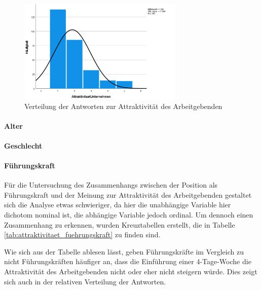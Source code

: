 \begin{figure}[h]
    \centering
    \includegraphics[width=0.7\textwidth]{04_Artefakte/01_Abbildungen/hypothese_5/attraktivitaet_histogram.png}
    \caption{Verteilung der Antworten zur Attraktivität des Arbeitgebenden}
    \label{fig:attraktivitaet_verteilung}
\end{figure}

\paragraph*{Alter}



\paragraph*{Geschlecht}



\paragraph*{Führungskraft}

Für die Untersuchung des Zusammenhangs zwischen der Position als Führungskraft und der Meinung zur Attraktivität des Arbeitgebenden
gestaltet sich die Analyse etwas schwieriger, da hier die unabhängige Variable hier dichotom nominal ist, die abhängige Variable jedoch
ordinal. Um dennoch einen Zusammenhang zu erkennen, wurden Kreuztabellen erstellt, die in Tabelle \ref{tab:attraktivitaet_fuehrungskraft}
zu finden sind.

Wie sich aus der Tabelle ablesen lässt, geben Führungskräfte im Vergleich zu nicht Führungskräften häufiger an, dass die Einführung
einer 4-Tage-Woche die Attraktivität des Arbeitgebenden nicht oder eher nicht steigern würde. Dies zeigt sich auch in der relativen 
Verteilung der Antworten.



